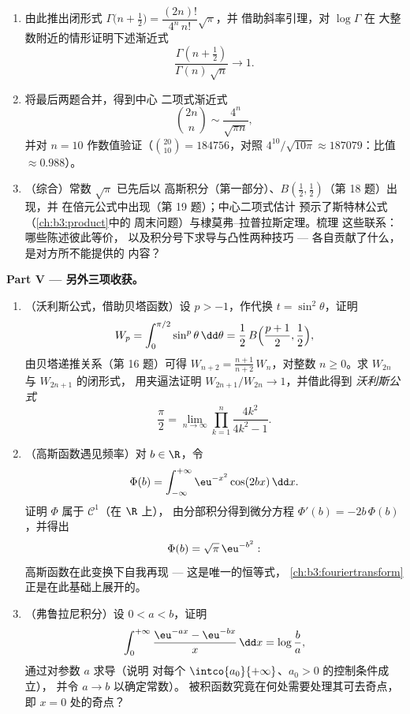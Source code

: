 \begin{problem}
\begin{enumerate}[resume]
        \[
        g(x) = \frac{2^{x-1}}{\sqrt\pi}\,
        \Gamma\Bigl(\frac x2\Bigr)
        \Gamma\Bigl(\frac{x+1}2\Bigr)
        \]
        满足玻尔--莫勒鲁普的三个假设，并
        由此得 $g = \Gamma$，即 $\Gamma(2z) =
        \frac{2^{2z-1}}{\sqrt\pi}\,\Gamma(z)\,\Gamma(z +
        \tfrac12)$ 对所有 $z > 0$ 成立。
  \item 由此推出闭形式 $\Gamma\bigl(n + \tfrac12\bigr)
        = \dfrac{(2n)!}{4^n\,n!}\sqrt\pi$，并
        借助斜率引理，对 $\log\Gamma$ 在
        大整数附近的情形证明下述渐近式
        \[
        \frac{\Gamma(n + \frac12)}{\Gamma(n)\,\sqrt n}
        \longrightarrow 1 .
        \]
  \item 将最后两题合并，得到中心
        二项式渐近式
        \[
        \binom{2n}{n} \sim \frac{4^n}{\sqrt{\pi n}},
        \]
        并对 $n = 10$ 作数值验证（$\binom{20}{10} =
        184756$，对照 $4^{10}/\sqrt{10\pi} \approx
        187079$：比值 $\approx 0.988$）。
  \item （综合）常数 $\sqrt\pi$ 已先后以
        高斯积分（第一部分）、$B(\frac12,
        \frac12)$（第 18 题）出现，并
        在倍元公式中出现（第 19 题）；中心二项式估计
        预示了斯特林公式（\cref{ch:b3:product}中的
        周末问题）与棣莫弗--拉普拉斯定理。梳理
        这些联系：哪些陈述彼此等价，
        以及积分号下求导与凸性两种技巧 ---
        各自贡献了什么，是对方所不能提供的
        内容？
\end{enumerate}

\medskip
\noindent\textbf{Part V --- 另外三项收获。}
\begin{enumerate}[resume]
  \item （沃利斯公式，借助贝塔函数）设 $p > -1$，作代换 $t =
        \sin^2\theta$，证明
        \[
        W_p = \int_0^{\pi/2}\sin^p\theta\,\dd\theta
        = \frac12\,B\Bigl(\frac{p+1}2, \frac12\Bigr),
        \]
        由贝塔递推关系（第 16 题）可得
        $W_{n+2} = \frac{n+1}{n+2}\,W_n$，对整数 $n \geq
        0$。求 $W_{2n}$ 与 $W_{2n+1}$ 的闭形式，
        用夹逼法证明 $W_{2n+1}/W_{2n} \to 1$，并借此得到
        \emph{沃利斯公式}
        \[
        \frac\pi2 = \lim_{n\to\infty}
        \prod_{k=1}^{n}\frac{4k^2}{4k^2 - 1} .
        \]
  \item （高斯函数遇见频率）对 $b \in \R$，令
        \[
        \Phi(b) = \int_{-\infty}^{+\infty}
        \eu^{-x^2}\cos(2bx)\,\dd x .
        \]
        证明 $\Phi$ 属于 $\mathcal C^1$（在 $\R$ 上），
        由分部积分得到微分方程
        $\Phi'(b) = -2b\,\Phi(b)$，并得出
        \[
        \Phi(b) = \sqrt\pi\,\eu^{-b^2} :
        \]
        高斯函数在此变换下自我再现 ---
        这是唯一的恒等式，
        \cref{ch:b3:fouriertransform}正是在此基础上展开的。
  \item （弗鲁拉尼积分）设 $0 < a < b$，证明
        \[
        \int_0^{+\infty}
        \frac{\eu^{-ax} - \eu^{-bx}}{x}\,\dd x
        = \log\frac ba ,
        \]
        通过对参数 $a$ 求导（说明
        对每个 $\intco{a_0}{+\infty}$、$a_0 > 0$ 的控制条件成立），
        并令 $a \to b$ 以确定常数）。
        被积函数究竟在何处需要处理其可去奇点，
        即 $x = 0$ 处的奇点？
\end{enumerate}
\end{problem}
